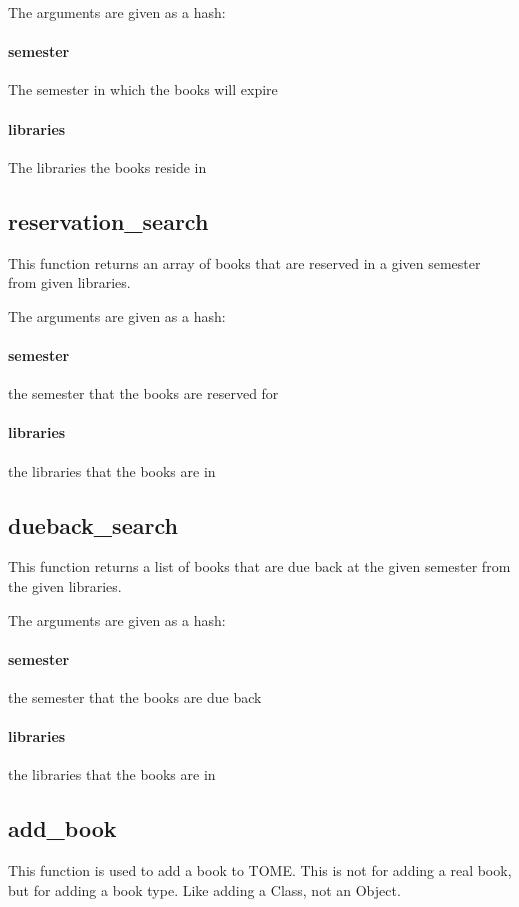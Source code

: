 \documentclass[12pt,titlepage]{article}
\begin{document}
The arguments are given as a hash:
\paragraph{semester}
The semester in which the books will expire 

\paragraph{libraries}
The libraries the books reside in

\subsection{reservation_search}
This function returns an array of books that are reserved in a given semester from given libraries.

The arguments are given as a hash:
\paragraph{semester}
the semester that the books are reserved for 

\paragraph{libraries}
the libraries that the books are in

\subsection{dueback_search}
This function returns a list of books that are due back at the given semester from the given libraries.

The arguments are given as a hash:
\paragraph{semester}
the semester that the books are due back 

\paragraph{libraries}
the libraries that the books are in

\subsection{add_book}
This function is used to add a book to TOME. This is not for adding a real book, but for adding a book type. Like adding a Class, not an Object.
\end{document}
